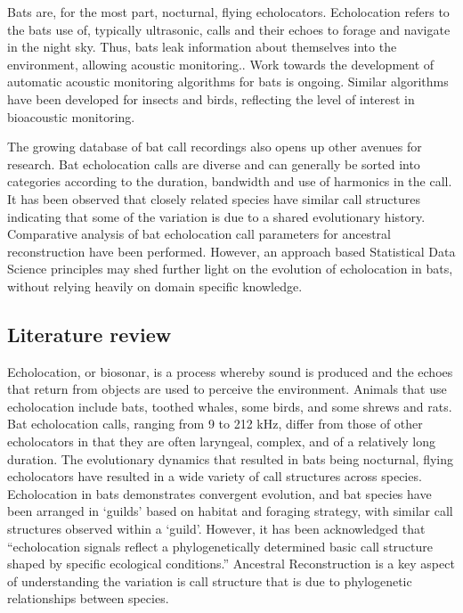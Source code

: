 \documentclass{ws-rv9x6}
\begin{document}
Bats are, for the most part, nocturnal, flying echolocators.\cite{kunz1994bats} Echolocation refers to the bats use of, typically ultrasonic\cite{corso1963bone}, calls and their echoes to forage and navigate in the night sky.\cite{griffin1944echolocation} Thus, bats leak information about themselves into the environment, allowing acoustic monitoring.\cite{pettorelli2013indicator}. Work towards the development of automatic acoustic monitoring algorithms for bats \cite{stathopoulos2017bat} \cite{walters2012continental} is ongoing. Similar algorithms have been developed for insects\cite{chesmore2004automated} and birds\cite{briggs2012acoustic}, reflecting the level of interest in bioacoustic monitoring.

The growing database of bat call recordings \cite{collen2012evolution} also opens up other avenues for research. Bat echolocation calls are diverse and can generally be sorted into categories according to the duration, bandwidth and use of harmonics in the call.\cite{maltby20104} It has been observed that closely related species have similar call structures indicating that some of the variation is due to a shared evolutionary history.\cite{jones2006evolution} Comparative analysis of bat echolocation call parameters for ancestral reconstruction\cite{joy2016ancestral} have been performed.\cite{collen2012evolution} However, an approach based Statistical Data Science principles may shed further light on the evolution of echolocation in bats, without relying heavily on domain specific knowledge.
 
\subsection{Literature review}

Echolocation, or biosonar, is a process whereby sound is produced and the echoes that return from objects are used to perceive the environment.\cite{jones2005echolocation} Animals that use echolocation include bats, toothed whales, some birds, and some shrews and rats.\cite{jones2005echolocation} Bat echolocation calls, ranging from 9 to 212 kHz, differ from those of other echolocators in that they are often laryngeal, complex, and of a relatively long duration.\cite{thomas2004echolocation} The evolutionary dynamics that resulted in bats being nocturnal, flying echolocators have resulted in a wide variety of call structures across species.\cite{jones2006evolution} Echolocation in bats demonstrates convergent evolution, and bat species have been arranged in `guilds' based on habitat and foraging strategy, with similar call structures observed within a `guild'. \cite{aldridge1987morphology} \cite{neuweiler1990auditory} \cite{schnitzler2001echolocation} However, it has been acknowledged that ``echolocation signals reflect a phylogenetically determined basic call structure shaped by specific ecological conditions.''\cite{schnitzler2004evolution} Ancestral Reconstruction is a key aspect of understanding the variation is call structure that is due to phylogenetic relationships between species. 
\end{document}
